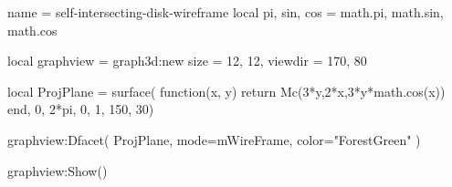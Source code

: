 \documentclass{standalone}
\begin{document}
\begin{luadraw}{name = self-intersecting-disk-wireframe}
local pi, sin, cos = math.pi, math.sin, math.cos

local graphview = graph3d:new{
  size    = {12, 12},
  viewdir = {170, 80}
}

local ProjPlane =  surface(
  function(x, y)
    return Mc(3*y,2*x,3*y*math.cos(x))
  end,
  0, 2*pi, 0, 1,
  {150, 30})

graphview:Dfacet(
  ProjPlane,
  {
    mode=mWireFrame,
    color="ForestGreen"
  })

graphview:Show()
\end{luadraw}
\end{document}

